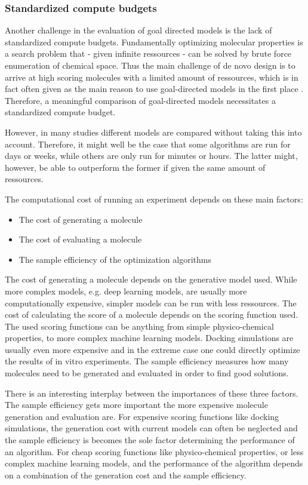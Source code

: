 \subsubsection{Standardized compute budgets}
Another challenge in the evaluation of goal directed models is the lack of 
standardized compute budgets. Fundamentally optimizing molecular properties is 
a search problem that - given infinite ressources - can be solved by brute force enumeration 
of chemical space. Thus the main challenge of de novo design is 
to arrive at high scoring molecules with a limited amount of ressources, 
which is in fact often given as the main reason to use goal-directed models
in the first place \citep{todo}. Therefore, a meaningful comparison of
goal-directed models necessitates a standardized compute budget.

However, in many studies different models are compared without taking this 
into account. Therefore, it might well be the case that some algorithms 
are run for days or weeks, while others are only run for minutes or hours. 
The latter might, however, be able to outperform the former if given the same
amount of ressources.

The computational cost of running an experiment depends on these main factors:
\begin{itemize}
    \item The cost of generating a molecule
    \item The cost of evaluating a molecule
    \item The sample efficiency of the optimization algorithms
\end{itemize}

The cost of generating a molecule depends on the generative model used.
While more complex models, e.g. deep learning models, are usually more 
computationally expensive, simpler models can be run with less ressources. 
The cost of calculating the score of a molecule depends on the scoring function used.
The used scoring functions can be anything from simple physico-chemical
properties, to more complex machine learning models. Docking simulations 
are usually even more expensive and in the extreme case one could directly optimize
the results of in vitro experiments. The sample efficiency measures how many molecules need to be generated and
evaluated in order to find good solutions.

There is an interesting interplay between the importances of these three factors.
The sample efficiency gets more important the more expensive molecule generation 
and evaluation are. For expensive scoring functions like docking simulations, the 
generation cost with current models can often be neglected and the sample efficiency 
is becomes the sole factor determining the performance of an algorithm. For cheap scoring functions
like physico-chemical properties, or less complex machine learning models, 
and the performance of the algorithm depends on a combination of the generation cost
and the sample efficiency.

